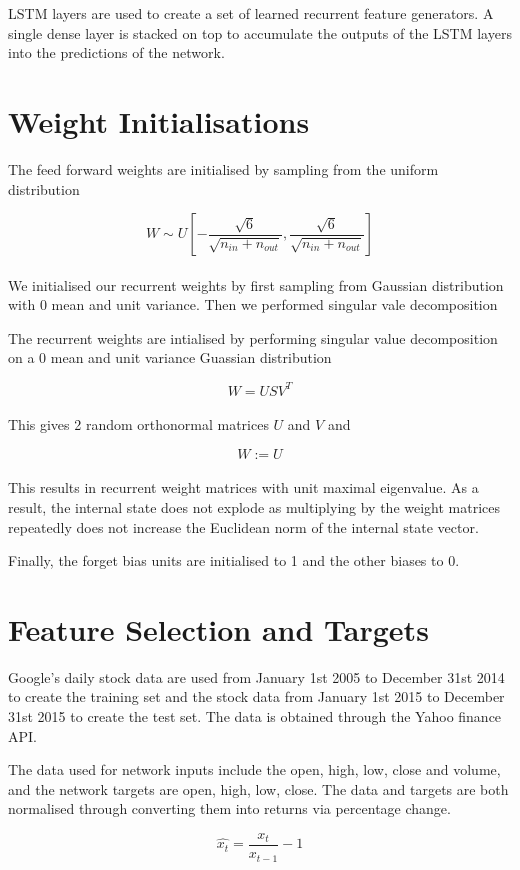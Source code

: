 \documentclass[11pt]{article}
\begin{document}
LSTM layers are used to create a set of learned recurrent feature generators. A single dense layer is stacked on top to accumulate the outputs of the LSTM layers into the predictions of the network.

\section{Weight Initialisations}

The feed forward weights are initialised by sampling from the uniform distribution \cite{FFDiff}

\[W \sim U \left[ -\frac{\sqrt{6}}{\sqrt{n_{in} + n_{out}}}, \frac{\sqrt{6}}{\sqrt{n_{in} + n_{out}}} \right] \]
\\
We initialised our recurrent weights by first sampling from Gaussian distribution with 0 mean and unit variance. Then we performed singular vale decomposition

The recurrent weights are intialised by performing singular value decomposition on a 0 mean and unit variance Guassian distribution

\[W = U S V^T\]
\\
This gives 2 random orthonormal matrices $U$ and $V$ and

\[W := U\]
\\
This results in recurrent weight matrices with unit maximal eigenvalue. As a result, the internal state does not explode as multiplying by the weight matrices repeatedly does not increase the Euclidean norm of the internal state vector.

Finally, the forget bias units are initialised to 1 and the other biases to 0.

\section{Feature Selection and Targets}

Google's daily stock data are used from January 1st 2005 to December 31st 2014 to create the training set and the stock data from January 1st 2015 to December 31st 2015 to create the test set. The data is obtained through the Yahoo finance API.

The data used for network inputs include the open, high, low, close and volume, and the network targets are open, high, low, close. The data and targets are both normalised through converting them into returns via percentage change.

\[ \hat{x_t} = \frac{x_t}{x_{t-1}} - 1 \]
\end{document}

